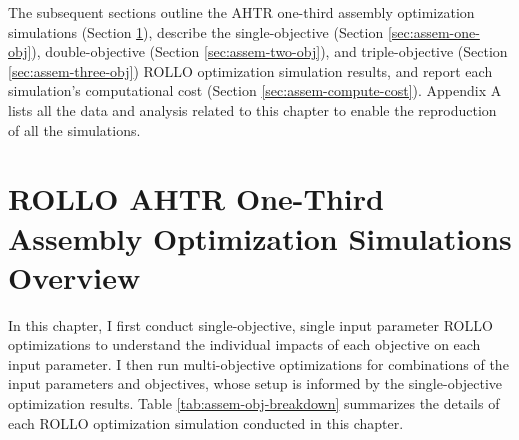 The subsequent sections outline the \gls{AHTR} one-third assembly optimization 
simulations (Section \ref{sec:assem-overview}), describe the single-objective 
(Section \ref{sec:assem-one-obj}), double-objective (Section \ref{sec:assem-two-obj}), 
and triple-objective (Section \ref{sec:assem-three-obj}) \gls{ROLLO} optimization 
simulation results, and report each simulation's computational cost 
(Section \ref{sec:assem-compute-cost}).
Appendix A lists all the data and analysis related to this chapter to enable the 
reproduction of all the simulations.

\section{ROLLO AHTR One-Third Assembly Optimization Simulations Overview}
\label{sec:assem-overview}
In this chapter, I first conduct single-objective, single input parameter 
\gls{ROLLO} optimizations to understand the individual impacts of each objective on each 
input parameter. 
I then run multi-objective optimizations for combinations of the input parameters 
and objectives, whose setup is informed by the single-objective optimization results.
Table \ref{tab:assem-obj-breakdown} summarizes the details of each \gls{ROLLO} 
optimization simulation conducted in this chapter.
